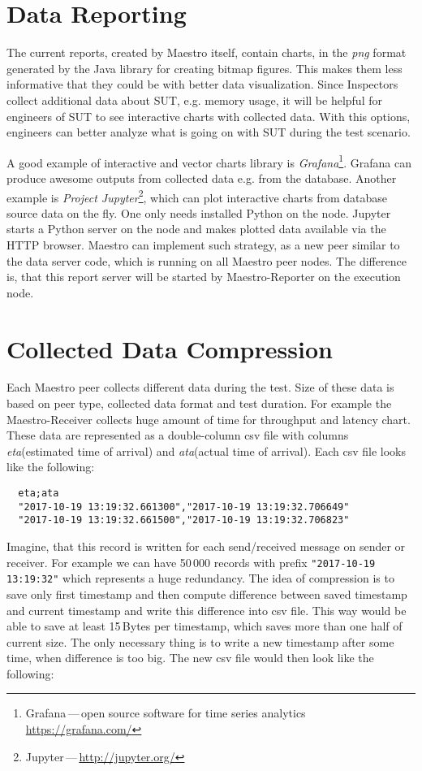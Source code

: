 \section{Data Reporting}
The current reports, created by Maestro itself, contain charts, in the \emph{png} format generated by the Java library for creating bitmap figures. This makes them less informative that they could be with better data visualization. Since Inspectors collect additional data about SUT, e.g. memory usage, it will be helpful for engineers of SUT to see interactive charts with collected data. With this options, engineers can better analyze what is going on with SUT during the test scenario.

A good example of interactive and vector charts library is \emph{Grafana}\footnote{Grafana\,---\,open source software for time series analytics \url{https://grafana.com/}}. Grafana can produce awesome outputs from collected data e.g. from the database. Another example is \emph{Project Jupyter}\footnote{Jupyter\,---\,\url{http://jupyter.org/}}, which can plot interactive charts from database source data on the fly. One only needs installed Python on the node. Jupyter starts a Python server on the node and makes plotted data available via the HTTP browser. Maestro can implement such strategy, as a new peer similar to the data server code, which is running on all Maestro peer nodes. The difference is, that this report server will be started by Maestro-Reporter on the execution node.

\section{Collected Data Compression}
Each Maestro peer collects different data during the test. Size of these data is based on peer type, collected data format and test duration. For example the Maestro-Receiver collects huge amount of time for throughput and latency chart. These data are represented as a double-column csv file with columns \emph{eta}(estimated time of arrival) and \emph{ata}(actual time of arrival). Each csv file looks like the following:

\begin{verbatim}
  eta;ata
  "2017-10-19 13:19:32.661300","2017-10-19 13:19:32.706649"
  "2017-10-19 13:19:32.661500","2017-10-19 13:19:32.706823"
\end{verbatim}

Imagine, that this record is written for each send/received message on sender or receiver. For example we can have 50\,000 records with prefix \texttt{"2017-10-19 13:19:32"} which represents a huge redundancy. The idea of compression is to save only first timestamp and then compute difference between saved timestamp and current timestamp and write this difference into csv file. This way would be able to save at least 15\,Bytes per timestamp, which saves more than one half of current size. The only necessary thing is to write a new timestamp after some time, when difference is too big. The new csv file would then look like the following:

